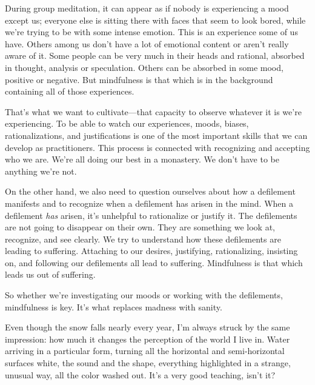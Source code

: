 During group meditation, it can appear as if nobody is experiencing a 
mood except us; everyone else is sitting there with faces that seem to 
look bored, while we're trying to be with some intense emotion. This is 
an experience some of us have. Others among us don't have a lot of 
emotional content or aren't really aware of it. Some people can be very 
much in their heads and rational, absorbed in thought, analysis or 
speculation. Others can be absorbed in some mood, positive or negative. 
But mindfulness is that which is in the background containing all of 
those experiences.

That's what we want to cultivate---that capacity to observe whatever it 
is we're experiencing. To be able to watch our experiences, moods, 
biases, rationalizations, and justifications is one of the most 
important skills that we can develop as practitioners. This process is 
connected with recognizing and accepting who we are. We're all doing 
our best in a monastery. We don't have to be anything we're not.

On the other hand, we also need to question ourselves about how a 
defilement manifests and to recognize when a defilement has arisen in 
the mind. When a defilement \emph{has} arisen, it's unhelpful to 
rationalize or justify it. The defilements are not going to disappear 
on their own. They are something we look at, recognize, and see 
clearly. We try to understand how these defilements are leading to 
suffering. Attaching to our desires, justifying, rationalizing, 
insisting on, and following our defilements all lead to suffering. 
Mindfulness is that which leads us out of suffering.

So whether we're investigating our moods or working with the 
defilements, mindfulness is key. It's what replaces madness with sanity.


Even though the snow falls nearly every year, I'm always struck by the 
same impression: how much it changes the perception of the world I live 
in. Water arriving in a particular form, turning all the horizontal and 
semi-horizontal surfaces white, the sound and the shape, everything 
highlighted in a strange, unusual way, all the color washed out. It's a 
very good teaching, isn't it?

